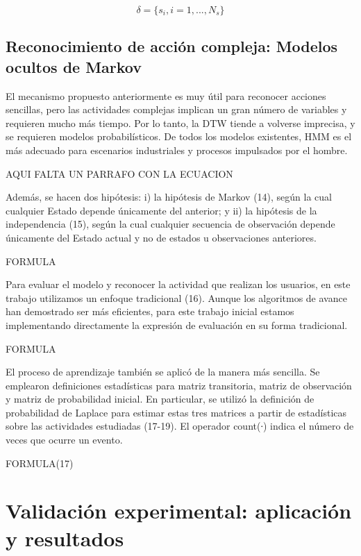 \documentclass[a4paper]{article}
\begin{document}
\begin{equation}
\delta = \{s_i, i = 1, ..., N_s\}
\end{equation}


\subsection{Reconocimiento de acción compleja: Modelos ocultos de Markov}

El mecanismo propuesto anteriormente es muy útil para reconocer acciones sencillas, pero las actividades complejas implican un gran número de variables y requieren mucho más tiempo. Por lo tanto, la DTW tiende a volverse imprecisa, y se requieren modelos probabilísticos. De todos los modelos existentes, HMM es el más adecuado para escenarios industriales y procesos impulsados por el hombre.

AQUI FALTA UN PARRAFO CON LA ECUACION

Además, se hacen dos hipótesis: i) la hipótesis de Markov (14), según la cual cualquier Estado depende únicamente del anterior; y ii) la hipótesis de la independencia (15), según la cual cualquier secuencia de observación depende únicamente del Estado actual y no de estados u observaciones anteriores.

FORMULA

Para evaluar el modelo y reconocer la actividad que realizan los usuarios, en este trabajo utilizamos un enfoque tradicional (16). Aunque los algoritmos de avance han demostrado ser más eficientes, para este trabajo inicial estamos implementando directamente la expresión de evaluación en su forma tradicional.

FORMULA

El proceso de aprendizaje también se aplicó de la manera más sencilla. Se emplearon definiciones estadísticas para matriz transitoria, matriz de observación y matriz de probabilidad inicial. En particular, se utilizó la definición de probabilidad de Laplace para estimar estas tres matrices a partir de estadísticas sobre las actividades estudiadas (17-19). El operador count(∙) indica el número de veces que ocurre un evento.

FORMULA(17)


\section{Validación experimental: aplicación y resultados}
\end{document}
